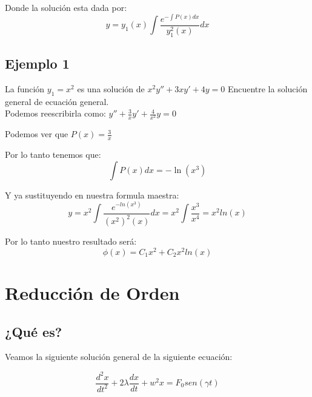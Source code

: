 \documentclass[12pt]{article}							    %
\begin{document}
Donde la solución esta dada por:
\begin{equation}
    y = y_1(x) \int \frac{ e^{-\int P(x) dx} }{y_1^2(x)} dx
\end{equation}

\subsection{Ejemplo 1}
La función $y_1 = x^2$ es una solución de $x^2 y'' + 3xy' +4y = 0$
Encuentre la solución general de ecuación general. \\

Podemos reescribirla como:
$y'' + \frac{3}{x}y' + \frac{4}{x^2}y = 0 $

Podemos ver que $P(x) = \frac{3}{x}$

Por lo tanto tenemos que:
\begin{equation*}
    \int P(x) dx = -\ln (x^3)
\end{equation*}

Y ya sustituyendo en nuestra formula maestra:
\begin{equation*}
    y = x^2 \int \frac{ e^{-ln(x^3)} }{(x^2)^2(x)} dx = x^2 \int \frac{x^3}{x^4} = x^2 ln(x)
\end{equation*}

Por lo tanto nuestro resultado será:
\begin{equation*}
    \phi(x) = C_1 x^2 + C_2 x^2 ln(x)
\end{equation*}




\section{Reducción de Orden}


\subsection{¿Qué es?}
Veamos la siguiente solución general de la siguiente ecuación:

\begin{equation}
	\frac{d^2 x}{dt^2} + 2 \lambda \frac{dx}{dt} + w^2 x = F_0 sen(\gamma t)
\end{equation}
\end{document}
